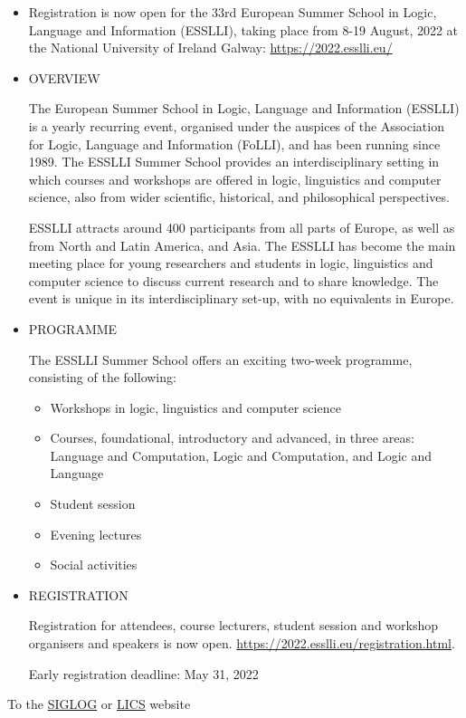 \documentclass[prodmode,acmtecs]{acmsmall} %
\begin{document}
\begin{itemize}\item   Registration is now open for the 33rd European Summer School in Logic, Language and Information (ESSLLI), taking place from 8-19 August, 2022 at the National University of Ireland Galway: \href{https://2022.esslli.eu/}{https://2022.esslli.eu/} 
 
\item  OVERVIEW 
 
  The European Summer School in Logic, Language and Information (ESSLLI) is a yearly recurring event, organised under the auspices of the Association for Logic, Language and Information (FoLLI), and has been running since 1989. The ESSLLI Summer School provides an interdisciplinary setting in which courses and workshops are offered in logic, linguistics and computer science, also from wider scientific, historical, and philosophical perspectives. 
 
  ESSLLI attracts around 400 participants from all parts of Europe, as well as from North and Latin America, and Asia. The ESSLLI has become the main meeting place for young researchers and students in logic, linguistics and computer science to discuss current research and to share knowledge. The event is unique in its interdisciplinary set-up, with no equivalents in Europe. 
 
\item  PROGRAMME 
 
  The ESSLLI Summer School offers an exciting two-week programme, consisting of the following:  
 
\begin{itemize}\item  Workshops in logic, linguistics and computer science 
\item  Courses, foundational, introductory and advanced, in three areas: Language and Computation, Logic and Computation, and Logic and Language 
\item  Student session 
\item  Evening lectures 
\item  Social activities
\end{itemize} 
\item  REGISTRATION 
 
  Registration for attendees, course lecturers, student session and workshop organisers and speakers is now open. \href{https://2022.esslli.eu/registration.html}{https://2022.esslli.eu/registration.html}.  
 
Early registration deadline: May 31, 2022 
 
\end{itemize}


To the \href{http://siglog.org/}{SIGLOG} or \href{https://lics.siglog.org}{LICS} website
\end{document}
